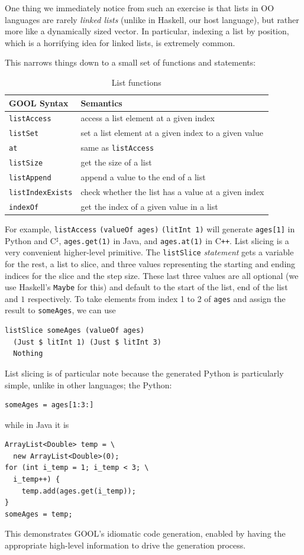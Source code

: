 \documentclass[sigplan,review,anonymous,prologue,dvipsnames]{acmart}
\newcommand{\Csharp}{C$^{\sharp}$}
\newcommand{\Cplusplus}{C\texttt{++}}
\begin{document}
One thing we immediately notice from such an exercise is that lists in
OO languages are rarely \emph{linked lists} (unlike in Haskell, our host
language), but rather more like a dynamically sized vector. In particular,
indexing a list by position, which is a horrifying idea for linked lists,
is extremely common.

This narrows things down to a small set of functions and statements:
\begin{table}[!h]
\caption{List functions}
\begin{tabular}{p{} p{}}
  \textbf{GOOL Syntax} & \textbf{Semantics} \\
  \midrule
  \verb|listAccess| & access a list element at a given index \\
  \verb|listSet| & set a list element at a given index to a given value \\
  \verb|at| & same as \verb|listAccess| \\
  \verb|listSize| & get the size of a list \\
  \verb|listAppend| & append a value to the end of a list \\
  \verb|listIndexExists| & check whether the list has a value at a given index 
  \\
  \verb|indexOf| & get the index of a given value in a list \\
\end{tabular}
\label{tab:listfuncs}
\end{table}
For example, \verb|listAccess| \verb|(valueOf ages)| \verb|(litInt 1)| will 
generate
\verb|ages[1]| in Python and \Csharp, \verb|ages.get(1)| in Java, and
\verb|ages.at(1)| in \Cplusplus.  List slicing is a very convenient
higher-level primitive.  The \verb|listSlice| \emph{statement} gets
a variable for the rest, a list to slice, and three
values representing the starting and ending indices for the slice and the step
size. These last three values are all optional (we use Haskell's \verb|Maybe|
for this) and default to the start of the list, end of the list and $1$
respectively.  To take elements from index 1 to 2 of \verb|ages| and
assign the result to \verb|someAges|, we can use
\begin{lstlisting}
listSlice someAges (valueOf ages)
  (Just $ litInt 1) (Just $ litInt 3)
  Nothing
\end{lstlisting}
List slicing is of particular note because the generated Python is particularly
simple, unlike in other languages; the Python:
\begin{lstlisting}
someAges = ages[1:3:]
\end{lstlisting}
while in Java it is
\begin{lstlisting}
ArrayList<Double> temp = \
  new ArrayList<Double>(0);
for (int i_temp = 1; i_temp < 3; \
  i_temp++) {
    temp.add(ages.get(i_temp));
}
someAges = temp;
\end{lstlisting}
This demonstrates GOOL's idiomatic code generation, enabled by having the
appropriate high-level information to drive the generation process.
\end{document}
